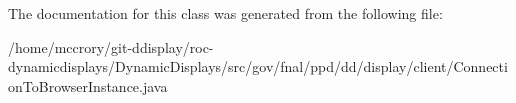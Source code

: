 The documentation for this class was generated from the following file\-:\begin{DoxyCompactItemize}
\item 
/home/mccrory/git-\/ddisplay/roc-\/dynamicdisplays/\-Dynamic\-Displays/src/gov/fnal/ppd/dd/display/client/Connection\-To\-Browser\-Instance.\-java\end{DoxyCompactItemize}
